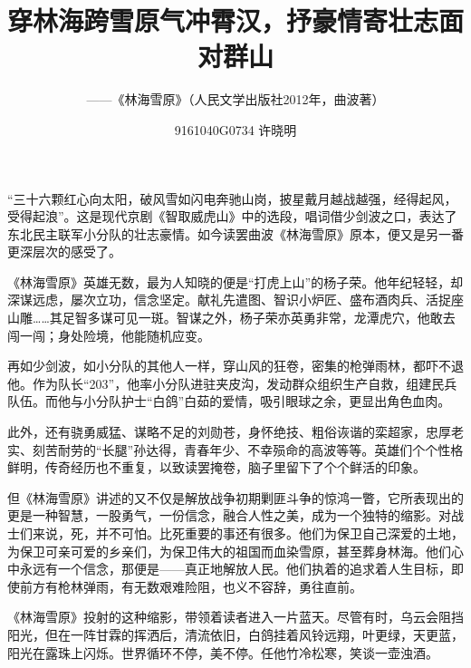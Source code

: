 \documentclass[12pt]{article}%
\title{穿林海跨雪原气冲霄汉，抒豪情寄壮志面对群山}
\author{——《林海雪原》（人民文学出版社2012年，曲波著）}
\date{9161040G0734 许晓明}
\begin{document}



\maketitle
“三十六颗红心向太阳，破风雪如闪电奔驰山岗，披星戴月越战越强，经得起风，受得起浪”。这是现代京剧《智取威虎山》中的选段，唱词借少剑波之口，表达了东北民主联军小分队的壮志豪情。如今读罢曲波《林海雪原》原本，便又是另一番更深层次的感受了。

《林海雪原》英雄无数，最为人知晓的便是“打虎上山”的杨子荣。他年纪轻轻，却深谋远虑，屡次立功，信念坚定。献礼先遣图、智识小炉匠、盛布酒肉兵、活捉座山雕……其足智多谋可见一斑。智谋之外，杨子荣亦英勇非常，龙潭虎穴，他敢去闯一闯；身处险境，他能随机应变。

再如少剑波，如小分队的其他人一样，穿山风的狂卷，密集的枪弹雨林，都吓不退他。作为队长“203”，他率小分队进驻夹皮沟，发动群众组织生产自救，组建民兵队伍。而他与小分队护士“白鸽”白茹的爱情，吸引眼球之余，更显出角色血肉。

此外，还有骁勇威猛、谋略不足的刘勋苍，身怀绝技、粗俗诙谐的栾超家，忠厚老实、刻苦耐劳的“长腿”孙达得，青春年少、不幸殒命的高波等等。英雄们个个性格鲜明，传奇经历也不重复，以致读罢掩卷，脑子里留下了个个鲜活的印象。

但《林海雪原》讲述的又不仅是解放战争初期剿匪斗争的惊鸿一瞥，它所表现出的更是一种智慧，一股勇气，一份信念，融合人性之美，成为一个独特的缩影。对战士们来说，死，并不可怕。比死重要的事还有很多。他们为保卫自己深爱的土地，为保卫可亲可爱的乡亲们，为保卫伟大的祖国而血染雪原，甚至葬身林海。他们心中永远有一个信念，那便是——真正地解放人民。他们执着的追求着人生目标，即使前方有枪林弹雨，有无数艰难险阻，也义不容辞，勇往直前。

《林海雪原》投射的这种缩影，带领着读者进入一片蓝天。尽管有时，乌云会阻挡阳光，但在一阵甘霖的挥洒后，清流依旧，白鸽挂着风铃远翔，叶更绿，天更蓝，阳光在露珠上闪烁。世界循环不停，美不停。任他竹冷松寒，笑谈一壶浊酒。
\end{document}
